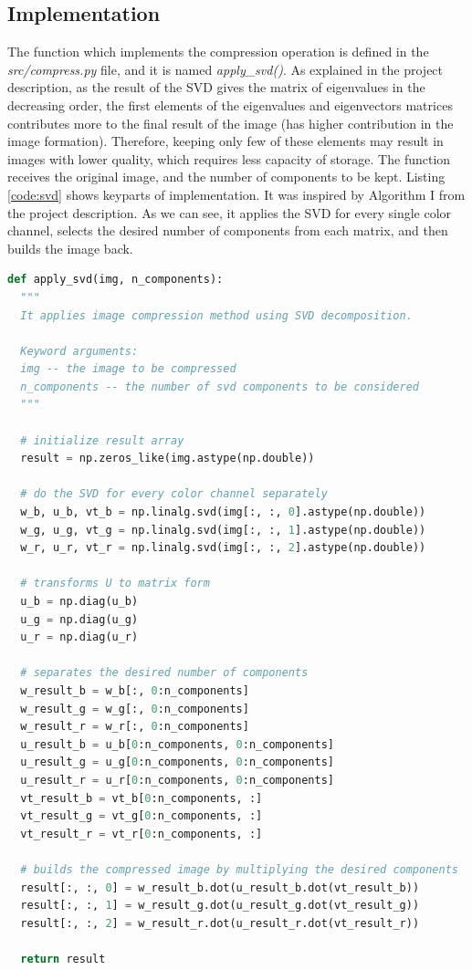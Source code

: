 \documentclass[]{IEEEtran}
\begin{document}
\subsection{Implementation}
The function which implements the compression operation is defined in the \textit{src/compress.py} file, and it is named \textit{apply\_svd()}. As explained in the project description\cite{PROJECT:5}, as the result of the SVD gives the matrix of eigenvalues in the decreasing order, the first elements of the eigenvalues and eigenvectors matrices contributes more to the final result of the image (has higher contribution in the image formation). Therefore, keeping only few of these elements may result in images with lower quality, which requires less capacity of storage. The function receives the original image, and the number of components to be kept. Listing \ref{code:svd} shows keyparts of implementation. It was inspired by Algorithm I from the project description. As we can see, it applies the SVD for every single color channel, selects the desired number of components from each matrix, and then builds the image back.

\begin{lstlisting}[language=Python, caption={Implementation of Compression with PCA}, label={code:svd}]
def apply_svd(img, n_components):
  """
  It applies image compression method using SVD decomposition.  

  Keyword arguments:
  img -- the image to be compressed
  n_components -- the number of svd components to be considered
  """

  # initialize result array
  result = np.zeros_like(img.astype(np.double))

  # do the SVD for every color channel separately
  w_b, u_b, vt_b = np.linalg.svd(img[:, :, 0].astype(np.double))
  w_g, u_g, vt_g = np.linalg.svd(img[:, :, 1].astype(np.double))
  w_r, u_r, vt_r = np.linalg.svd(img[:, :, 2].astype(np.double))

  # transforms U to matrix form
  u_b = np.diag(u_b)
  u_g = np.diag(u_g)
  u_r = np.diag(u_r)

  # separates the desired number of components
  w_result_b = w_b[:, 0:n_components]
  w_result_g = w_g[:, 0:n_components]
  w_result_r = w_r[:, 0:n_components]
  u_result_b = u_b[0:n_components, 0:n_components]
  u_result_g = u_g[0:n_components, 0:n_components]
  u_result_r = u_r[0:n_components, 0:n_components]
  vt_result_b = vt_b[0:n_components, :]
  vt_result_g = vt_g[0:n_components, :]
  vt_result_r = vt_r[0:n_components, :]

  # builds the compressed image by multiplying the desired components
  result[:, :, 0] = w_result_b.dot(u_result_b.dot(vt_result_b))
  result[:, :, 1] = w_result_g.dot(u_result_g.dot(vt_result_g))
  result[:, :, 2] = w_result_r.dot(u_result_r.dot(vt_result_r))

  return result

\end{lstlisting}
\end{document}
